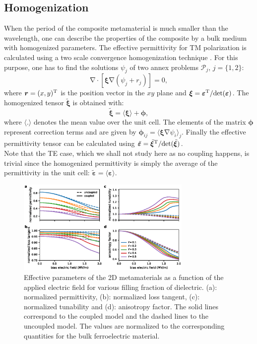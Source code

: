 \documentclass[%
 aip,
 amsmath,amssymb,
 reprint,%
]{revtex4-1}
\newcommand{\B}{\boldsymbol}
\newcommand{\tens}[1]{\B{#1}}
\newcommand{\grad}{\B{\mathrm{\nabla}}}
\renewcommand{\div}{\B{\mathrm{\nabla\cdotp}}}
\newcommand{\epstens}{\tens{\varepsilon}}
\newcommand{\epshom}{\tilde{\epstens}}
\newcommand{\xitens}{\tens{\xi}}
\newcommand{\xihom}{\tilde{\xitens}}
\newcommand{\co}[1]{#1}
\begin{document}
\subsection{Homogenization}
\co{When the period of the composite metamaterial is much smaller than the wavelength, one can
describe the properties of the composite by a bulk medium with homogenized parameters.}
The effective permittivity for TM polarization is calculated
using a two scale convergence homogenization technique \cite{allaire_homogenization_1992, guenneau_homogenization_2000}.
For this purpose, one has to find the solutions
$\psi_j$ of two annex problems $\mathcal P_j$, $j=\{1, 2\}$:
\begin{equation}
 \div \left[ \xitens \grad(\psi_j + r_j) \right] = 0,
 \label{eq_hom_annex}
\end{equation}
where $\B r = (x, y)^{\rm T}$ is the position vector in the $xy$ plane and
$\xitens=\epstens^{\rm T}/ {\rm det }(\epstens)$.
The homogenized tensor $\xihom$ is obtained with:
\begin{equation}
 \xihom = \langle \xitens \rangle + \B \phi,
 \label{eq_hom}
\end{equation}
where $\langle . \rangle$ denotes the mean value over the unit cell.
The elements of the matrix $\B \phi$ represent correction terms and
are given by $\B \phi_{ij} = \langle \xitens \grad \psi_i \rangle_j$.
Finally the effective permittivity tensor can be calculated using $\epshom=\xihom^{\rm T}/ {\rm det }(\xihom)$.\\
Note that the TE case, which we shall not study here as no coupling happens, is trivial since
the homogenized permittivity is simply the average of the permittivity in the unit cell:
$\epshom = \langle \epstens \rangle$.







\begin{figure}[!t]
 \centering
 \includegraphics[width=0.75\textwidth]{effective_params_per}
 \caption{Effective parameters of the 2D metamaterials as a function of the
  applied electric field for various filling fraction of dielectric.
  (a): normalized permittivity, (b): normalized loss tangent, (c): normalized tunability and
  (d): anisotropy factor. The solid lines correspond to the coupled model and
  the dashed lines to the uncoupled model. \co{The values are normalized to the corresponding quantities for the bulk ferroelectric material.}}
 \label{eff_par_2D_TM}
\end{figure}
\end{document}

